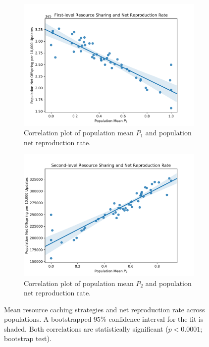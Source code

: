 \begin{figure}
\begin{center}

\begin{subfigure}[b]{0.5\columnwidth}
  \includegraphics[width=\columnwidth]{img/mean_res_pool1_vs_net_reproduction}
  \caption{
  Correlation plot of population mean $P_1$ and population net reproduction rate.
  }
  \label{fig:mean_res_pool1_vs_net_reproduction}
\end{subfigure}%
\begin{subfigure}[b]{0.5\columnwidth}
  \includegraphics[width=\columnwidth]{img/mean_res_pool2_vs_net_reproduction}
  \caption{
  Correlation plot of population mean $P_2$ and population net reproduction rate.
  }
  \label{fig:mean_res_pool2_vs_net_reproduction}
\end{subfigure}
\caption{
Mean resource caching strategies and net reproduction rate across populations.
A bootstrapped 95\% confidence interval for the fit is shaded.
Both correlations are statistically significant ($p < 0.0001$; bootstrap test).
}
\label{fig:net_reproduction}
\end{center}
\end{figure}
